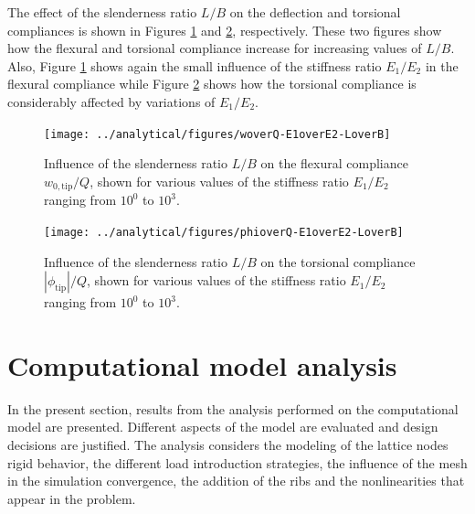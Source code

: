     The effect of the slenderness ratio $L/B$ on the deflection and torsional compliances is shown in Figures \ref{fig:woverQ-E1overE2-LoverB} and \ref{fig:phioverQ-E1overE2-LoverB}, respectively. These two figures show how the flexural and torsional compliance increase for increasing values of $L/B$. Also, Figure \ref{fig:woverQ-E1overE2-LoverB} shows again the small influence of the stiffness ratio $E_1/E_2$ in the flexural compliance while Figure \ref{fig:phioverQ-E1overE2-LoverB} shows how the torsional compliance is considerably affected by variations of $E_1/E_2$.

    \begin{figure}[!htpb] %
      \centering
      \texttt{[image: ../analytical/figures/woverQ-E1overE2-LoverB]}
      \caption[Influence of the slenderness ratio $L/B$ on the flexural compliance]{Influence of the slenderness ratio $L/B$ on the flexural compliance $w_{\mathrm{0,tip}} / Q$, shown for various values of the stiffness ratio $E_1/E_2$ ranging from $10^0$ to $10^3$. }\label{fig:woverQ-E1overE2-LoverB}
    \end{figure}

    \begin{figure}[!htpb] %
      \centering
      \texttt{[image: ../analytical/figures/phioverQ-E1overE2-LoverB]}
      \caption[Influence of the slenderness ratio $L/B$ on the torsional compliance]{Influence of the slenderness ratio $L/B$ on the torsional compliance $|\phi_{\mathrm{tip}}| / Q$, shown for various values of the stiffness ratio $E_1/E_2$ ranging from $10^0$ to $10^3$. }\label{fig:phioverQ-E1overE2-LoverB}
    \end{figure}

\clearpage
\section{Computational model analysis} \label{sec:computationalModelAnalysis_results_model}

  In the present section, results from the analysis performed on the computational model are presented. Different aspects of the model are evaluated and design decisions are justified. The analysis considers the modeling of the lattice nodes rigid behavior, the different load introduction strategies, the influence of the mesh in the simulation convergence, the addition of the ribs and the nonlinearities that appear in the problem.

